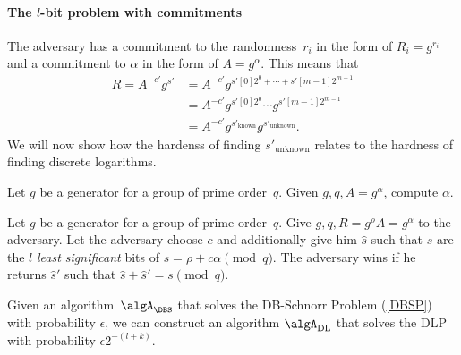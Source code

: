 \paragraph*{The \(l\)-bit problem with commitments}

The adversary has a commitment to the randomness~\(r_i\) in the form of \(R_i = 
g^{r_i}\) and a commitment to \(\alpha\) in the form of \(A = g^\alpha\).
This means that
\begin{align*}
  R = A^{-c'} g^{s'} &= A^{-c'} g^{s'[0] 2^0 + \dotsb + s'[m-1] 2^{m-1}} \\
                     &= A^{-c'} g^{s'[0] 2^0} \dotsb g^{s'[m-1] 2^{m-1}} \\
                     &= A^{-c'} g^{s'_{\text{known}}} g^{s'_{\text{unknown}}}.
\end{align*}
We will now show how the hardenss of finding \(s'_\text{unknown}\) relates to 
the hardness of finding discrete logarithms.

\begin{definition}
  Let \(g\) be a generator for a group of prime order~\(q\).
  Given \(g, q, A = g^\alpha\), compute \(\alpha\).
\end{definition}

\begin{definition}%
  \label{DBSP}
  Let \(g\) be a generator for a group of prime order~\(q\).
  Give \(g, q, R = g^\rho A = g^\alpha\) to the adversary.
  Let the adversary choose \(c\) and additionally give him \(\hat s\) such that 
  \(\hat s\) are the \(l\) \emph{least significant} bits of \(s = \rho + 
  c\alpha \pmod q\).
  The adversary wins if he returns \(\hat s'\) such that \(\hat s + \hat s' = s 
  \pmod q\).
\end{definition}

\begin{lemma}\label{DBSPtoDLP}
  Given an algorithm~\(\algA_{\DBS}\) that solves the DB-Schnorr Problem 
  (\cref{DBSP}) with probability \(\epsilon\), we can construct an 
  algorithm \(\algA_{\text{DL}}\) that solves the \ac{DLP} with probability 
  \(\epsilon 2^{-(l+k)}\).
\end{lemma}

